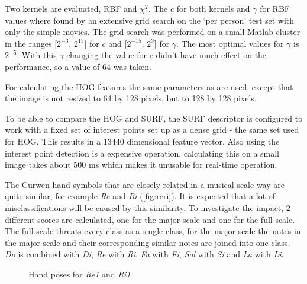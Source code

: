 Two kernels are evaluated, RBF and $\chi^2$. The $c$ for both kernels and $\gamma$ for RBF values where found by an extensive grid search on the `per person' test set with only the simple movies. The grid search was performed on a small Matlab cluster in the ranges $[2^{-3}$, $2^{15}]$ for $c$ and $[2^{-15}$, $2^3]$ for $\gamma$. The most optimal values for $\gamma$ is $2^{-5}$. With this $\gamma$ changing the value for $c$ didn't have much effect on the performance, so a value of 64 was taken.

For calculating the HOG features the same parameters as \citep{watanabe2009} are used, except that the image is not resized to 64 by 128 pixels, but to 128 by 128 pixels.

To be able to compare the HOG and SURF, the SURF descriptor is configured to work with a fixed set of interest points set up as a dense grid - the same set used for HOG. This results in a 13440 dimensional feature vector. Also using the interest point detection is a expensive operation, calculating this on a small image takes about 500 ms which makes it unusable for real-time operation.

The Curwen hand symbols that are closely related in a musical scale way are quite similar, for example \emph{Re} and \emph{Ri} (\autoref{fig:reri}). It is expected that a lot of misclassifications will be caused by this similarity. To investigate the impact, 2 different scores are calculated, one for the major scale and one for the full scale. The full scale threats every class as a single class, for the major scale the notes in the major scale and their corresponding similar notes are joined into one class. \emph{Do} is combined with \emph{Di}, \emph{Re} with \emph{Ri}, \emph{Fa} with \emph{Fi}, \emph{Sol} with \emph{Si} and \emph{La} with \emph{Li}.


\begin{figure}[tb]
  \centering
{}
\hspace{0.03\linewidth}
  \caption{Hand poses for \emph{Re1} and \emph{Ri1}}
  \label{fig:reri}
\end{figure}


